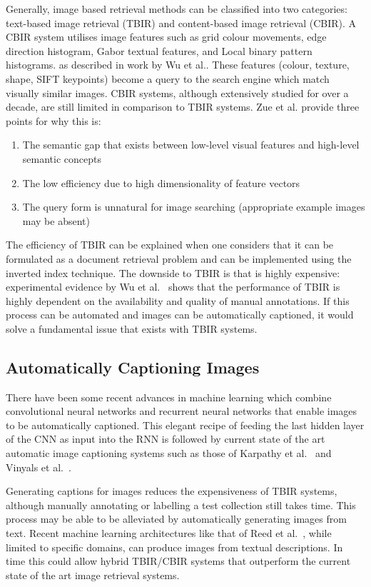 Generally, image based retrieval methods can be classified into two categories: text-based image retrieval (TBIR) and content-based image retrieval (CBIR). A CBIR system utilises image features such as grid colour movements, edge direction histogram, Gabor textual features, and Local binary pattern histograms. as described in work by Wu et al.\cite{wu2009distance}. These features (colour, texture, shape, SIFT keypoints) become a query to the search engine which match visually similar images. CBIR systems, although extensively studied for over a decade, are still limited in comparison to TBIR systems. Zue et al.\cite{zhu2010image} provide three points for why this is:
\begin{enumerate}
    \item The semantic gap that exists between low-level visual features and high-level semantic concepts
    \item The low efficiency due to high dimensionality of feature vectors
    \item The query form is unnatural for image searching (appropriate example images may be absent)
\end{enumerate}
The efficiency of TBIR can be explained when one considers that it can be formulated as a document retrieval problem and can be implemented using the inverted index technique. The downside to TBIR is that is highly expensive: experimental evidence by Wu et al.~\cite{wu2013tag} shows that the performance of TBIR is highly dependent on the availability and quality of manual annotations. If this process can be automated and images can be automatically captioned, it would solve a fundamental issue that exists with TBIR systems.

\subsection{Automatically Captioning Images}

There have been some recent advances in machine learning which combine convolutional neural networks and recurrent neural networks that enable images to be automatically captioned. This elegant recipe of feeding the last hidden layer of the CNN as input into the RNN is followed by current state of the art automatic image captioning systems such as those of Karpathy et al.~\cite{karpathy2015deep} and Vinyals et al.~\cite{arXiv2016160906647V}.

Generating captions for images reduces the expensiveness of TBIR systems, although manually annotating or labelling a test collection still takes time. This process may be able to be alleviated by automatically generating images from text. Recent machine learning architectures like that of Reed et al.~\cite{reed2016generative}, while limited to specific domains, can produce images from textual descriptions. In time this could allow hybrid TBIR/CBIR systems that outperform the current state of the art image retrieval systems.

